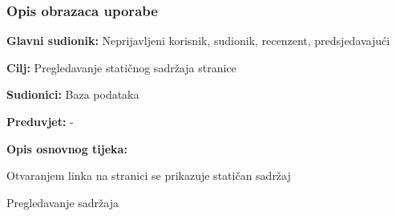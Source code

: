 				\subsubsection{Opis obrazaca uporabe}
					
					\noindent {}
					\begin{packed_item}
	
						\item \textbf{Glavni sudionik: } Neprijavljeni korisnik, sudionik, recenzent, predsjedavajući
						\item  \textbf{Cilj:} Pregledavanje statičnog sadržaja stranice
						\item  \textbf{Sudionici:} Baza podataka
						\item  \textbf{Preduvjet:} -
						\item  \textbf{Opis osnovnog tijeka:}
						
						\item[] \begin{packed_enum}
	
							\item Otvaranjem linka na stranici se prikazuje statičan sadržaj
							\item Pregledavanje sadržaja
						\end{packed_enum}
						

					\end{packed_item}

